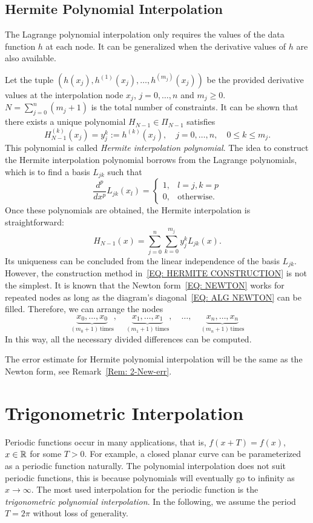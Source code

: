 \subsection{Hermite Polynomial Interpolation}
\label{SSec: 2-Her-Pol-Int}
The Lagrange polynomial interpolation only requires the values of the data function $h$ at each node. It can be generalized when the derivative values of $h$ are also available. 

Let the tuple $(h(x_j), h^{(1)}(x_j), \dots, h^{(m_j)}(x_j))$ be the provided derivative values at the interpolation node $x_j$, $j=0,\dots, n$ and $m_j\ge 0$. $N = \sum_{j=0}^n (m_j + 1)$ is the total number of constraints. It can be shown that there exists a unique polynomial $H_{N-1}\in \Pi_{N-1}$ satisfies 
$$H_{N-1}^{(k)}(x_j) = y_j^k:= h^{(k)}(x_j),\quad j=0,\dots, n,\quad 0\le k\le m_j.$$
This polynomial is called \emph{Hermite interpolation polynomial}. The idea to construct the Hermite interpolation polynomial borrows from the Lagrange polynomials, which is to find a basis $L_{jk}$ such that 
\begin{equation}\label{EQ: HERMITE CONSTRUCTION}
    \frac{d^p}{d x^p}L_{jk}(x_l) = \begin{cases}
        1, & l = j, k = p\\
        0, & \text{otherwise}.
    \end{cases}
\end{equation}
Once these polynomials are obtained, the Hermite interpolation is straightforward:
$$H_{N-1}(x) = \sum_{j=0}^n \sum_{k=0}^{m_j} y_j^k L_{jk}(x).$$
Its uniqueness can be concluded from the linear independence of the basis $L_{jk}$. However, the construction method in~\eqref{EQ: HERMITE CONSTRUCTION} is not the simplest. It is known that the Newton form~\eqref{EQ: NEWTON} works for repeated nodes as long as the diagram's diagonal~\eqref{EQ: ALG NEWTON} can be filled. Therefore, we can arrange the nodes 
$$\underbrace{x_0,\dots, x_0}_{(m_0+1)\,\text{times}}, \quad \underbrace{x_1,\dots, x_1}_{(m_1+1)\,\text{times}}, \quad \dots,\quad  \underbrace{x_n,\dots, x_n}_{(m_n+1)\,\text{times}}$$
In this way, all the necessary divided differences can be computed.
\begin{remark}
    The error estimate for Hermite polynomial interpolation will be the same as the Newton form, see Remark~\ref{Rem: 2-New-err}.
\end{remark}


\section{Trigonometric Interpolation}
\label{Sec: 2-Tri-Int}
Periodic functions occur in many applications, that is, $f(x + T) = f(x)$, $x\in \mathbb R$ for some $T > 0$. For example, a closed planar curve can be parameterized as a periodic function naturally. The polynomial interpolation does not suit periodic functions, this is because polynomials will eventually go to infinity as $x\to\infty$. The most used interpolation for the periodic function is the \emph{trigonometric polynomial interpolation}. In the following, we assume the period $T = 2\pi$ without loss of generality.



